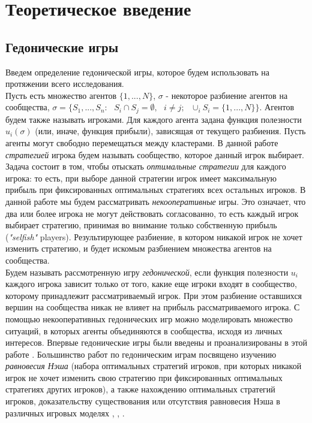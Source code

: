 \chapter{Теоретическое введение}

\section{Гедонические игры}
Введем определение гедонической игры, которое будем использовать на протяжении всего исследования.\\

Пусть есть множество агентов $\{1,...,N\}$, $\sigma$ - некоторое разбиение агентов на сообщества, $\sigma=\{S_1,...,S_n:\textbf{ }S_i\cap S_j=\emptyset,\textbf{ }i\neq j;\textbf{ }\cup_i S_i=\{1,...,N\}\}$. Агентов будем также называть игроками. Для каждого агента задана функция полезности $u_i(\sigma)$ (или, иначе, функция прибыли), зависящая от текущего разбиения. Пусть агенты могут свободно перемещаться между кластерами. В данной работе \textit{стратегией} игрока будем называть сообщество, которое данный игрок выбирает. Задача состоит в том, чтобы отыскать \textit{оптимальные стратегии} для каждого игрока: то есть, при выборе данной стратегии игрок имеет максимальную прибыль при фиксированных оптимальных стратегиях всех остальных игроков. В данной работе мы будем рассматривать \textit{некооперативные} игры. Это означает, что два или более игрока не могут действовать согласованно, то есть каждый игрок выбирает стратегию, принимая во внимание только собственную прибыль (\textit{"selfish"} players). Результирующее разбиение, в котором никакой игрок не хочет изменить стратегию, и будет искомым разбиением множества агентов на сообщества.\\

Будем называть рассмотренную игру \textit{гедонической}, если функция полезности $u_i$ каждого игрока зависит только от того, какие еще игроки входят в сообщество, которому принадлежит рассматриваемый игрок. При этом разбиение оставшихся вершин на сообщества никак не влияет на прибыль рассматриваемого игрока. С помощью некооперативных гедонических игр можно моделировать множество ситуаций, в которых агенты объединяются в сообщества, исходя из личных интересов. Впервые гедонические игры были введены и проанализированы в этой работе \cite{firsthg}. Большинство работ по гедоническим играм посвящено изучению \textit{равновесия Нэша} (набора оптимальных стратегий игроков, при которых никакой игрок не хочет изменить свою стратегию при фиксированных оптимальных стратегиях других игроков), а также нахождению оптимальных стратегий игроков, доказательству существования или отсутствия равновесия Нэша в различных игровых моделях \cite{core1}, \cite{core2}, \cite{core3}.\\

